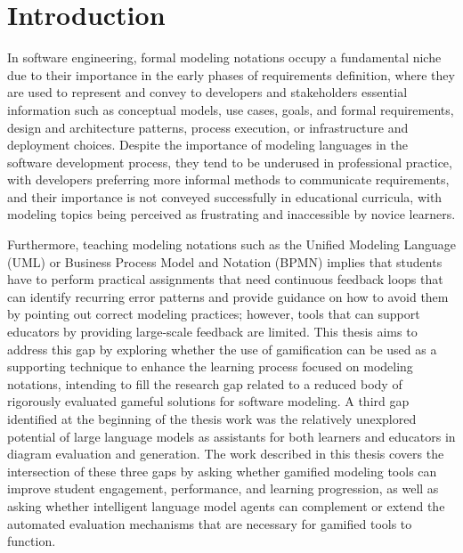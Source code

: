 \chapter{Introduction}
\label{ch1}

\graphicspath{{Chapter1/}}

In software engineering, formal modeling notations occupy a fundamental niche due to their importance in the early phases of requirements definition, where they are used to represent and convey to developers and stakeholders essential information such as conceptual models, use cases, goals, and formal requirements, design and architecture patterns, process execution, or infrastructure and deployment choices. Despite the importance of modeling languages in the software development process, they tend to be underused in professional practice, with developers preferring more informal methods to communicate requirements, and their importance is not conveyed successfully in educational curricula, with modeling topics being perceived as frustrating and inaccessible by novice learners.

Furthermore, teaching modeling notations such as the Unified Modeling Language (UML) or Business Process Model and Notation (BPMN) implies that students have to perform practical assignments that need continuous feedback loops that can identify recurring error patterns and provide guidance on how to avoid them by pointing out correct modeling practices; however, tools that can support educators by providing large-scale feedback are limited. This thesis aims to address this gap by exploring whether the use of gamification can be used as a supporting technique to enhance the learning process focused on modeling notations, intending to fill the research gap related to a reduced body of rigorously evaluated gameful solutions for software modeling. A third gap identified at the beginning of the thesis work was the relatively unexplored potential of large language models as assistants for both learners and educators in diagram evaluation and generation. The work described in this thesis covers the intersection of these three gaps by asking whether gamified modeling tools can improve student engagement, performance, and learning progression, as well as asking whether intelligent language model agents can complement or extend the automated evaluation mechanisms that are necessary for gamified tools to function. 

